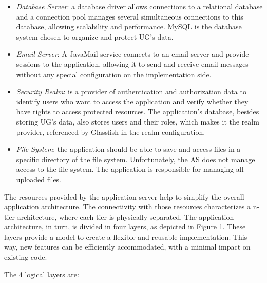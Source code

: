 \documentclass[envcountsame,envcountchap]{svmono}
\begin{document}
\begin{itemize}
\item \textit{Database Server}: a database driver allows connections to a relational database and a connection pool manages several simultaneous connections to this database, allowing scalability and performance. MySQL is the database system chosen to organize and protect UG's data.

\item \textit{Email Server}: A JavaMail service connects to an email server and provide sessions to the application, allowing it to send and receive email messages without any special configuration on the implementation side.

\item \textit{Security Realm}: is a provider of authentication and authorization data to identify users who want to access the application and verify whether they have rights to access protected resources.  The application's database, besides storing UG's data, also stores users and their roles, which makes it the realm provider, referenced by Glassfish in the realm configuration.

\item \textit{File System}: the application should be able to save and access files in a specific directory of the file system. Unfortunately, the AS does not manage access to the file system. The application is responsible for managing all uploaded files.
\end{itemize}

The resources provided by the application server help to simplify the overall application architecture. The connectivity with those resources characterizes a n-tier architecture, where each tier is physically separated. The application architecture, in turn, is divided in four layers, as depicted in Figure 1. These layers provide a model to create a flexible and reusable implementation. This way, new features can be efficiently accommodated, with a minimal impact on existing code.

The 4 logical layers are:
\end{document}
